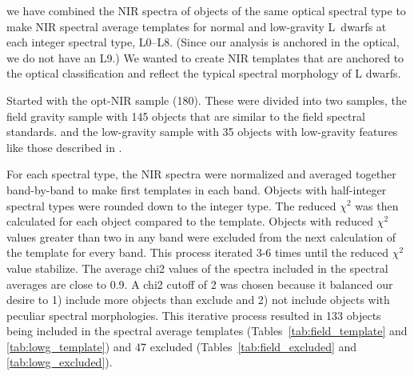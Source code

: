 \documentclass[12pt,preprint]{aastex}
\begin{document}
 we have combined the NIR spectra of objects of the same optical spectral type to make NIR spectral average templates for normal and low-gravity L~dwarfs at each integer spectral type, L0--L8. (Since our analysis is anchored in the optical, we do not have an L9.) 
We wanted to create NIR templates that are anchored to the optical classification and reflect the typical spectral morphology of L dwarfs. 

Started with the opt-NIR sample (180). These were divided into two samples, the field gravity sample with 145 objects that are similar to the \citet{K99} field spectral standards.
 and the low-gravity sample with 35 objects with low-gravity features like those described in \citet{Cruz09_lowg}.

For each spectral type, the NIR spectra were normalized and averaged together band-by-band to make first templates in each band. Objects with half-integer spectral types were rounded down to the integer type.
The reduced $\chi^2$ was then calculated for each object compared to the template.
Objects with reduced $\chi^2$ values greater than two in any band were excluded from the next calculation of the template for every band.
This process iterated 3-6 times until the reduced $\chi^2$ value stabilize. The average chi2 values of the spectra included in the spectral averages are close to 0.9. A chi2 cutoff of 2 was chosen because it balanced our desire to 1) include more objects than exclude and 2) not include objects with peculiar spectral morphologies. 
This iterative process resulted in 133 objects being included in the spectral average templates (Tables~\ref{tab:field_template} and \ref{tab:lowg_template}) and 47 excluded (Tables~\ref{tab:field_excluded} and \ref{tab:lowg_excluded}). 


\end{document}
